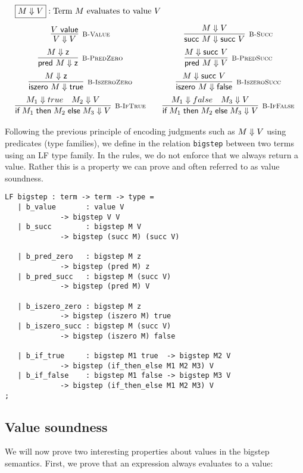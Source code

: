 \[
\begin{array}{c@{\qquad}c}
\multicolumn{2}{l}{\fbox{$M \BSteps V$}: \mbox{Term $M$ evaluates to value $V$}}\\[1em]
  \infer[\BValue]{V \BSteps V}{V \Value} &
  \infer[\BSucc]{\tmsucc M \BSteps \tmsucc V}{M \BSteps V}
\\[0.5em]
  \infer[\BPredZero]{\tmpred M \BSteps \tmzero}{M \BSteps \tmzero} &
  \infer[\BPredSucc]{\tmpred M \BSteps V}{M \BSteps \tmsucc V}
\\[0.5em]
  \infer[\BIszeroZero]{\tmiszero M \BSteps \tmtrue} {M \BSteps \tmzero} &
  \infer[\BIszeroSucc]{\tmiszero M \BSteps \tmfalse}{M \BSteps \tmsucc V}
\\[0.5em]
  \infer[\BIfTrue] {\tmif {M_1}{M_2}{M_3} \BSteps V}{M_1 \BSteps true  & M_2 \BSteps V} &
  \infer[\BIfFalse]{\tmif {M_1}{M_2}{M_3} \BSteps V}{M_1 \BSteps false & M_3 \BSteps V} \\
\end{array}
\]

Following the previous principle of encoding judgments such as $M \Downarrow V$
using predicates (type families), we define in \beluga the relation
\lstinline!bigstep! between two terms using an LF type family. In the rules, we
do not enforce that we always return a value. Rather this is a property we can
prove and often referred to as value soundness.

\begin{lstlisting}
LF bigstep : term -> term -> type =
   | b_value       : value V
		     -> bigstep V V
   | b_succ        : bigstep M V
		     -> bigstep (succ M) (succ V)

   | b_pred_zero   : bigstep M z
		     -> bigstep (pred M) z
   | b_pred_succ   : bigstep M (succ V)
		     -> bigstep (pred M) V

   | b_iszero_zero : bigstep M z
		     -> bigstep (iszero M) true
   | b_iszero_succ : bigstep M (succ V)
		     -> bigstep (iszero M) false

   | b_if_true     : bigstep M1 true  -> bigstep M2 V
		     -> bigstep (if_then_else M1 M2 M3) V
   | b_if_false    : bigstep M1 false -> bigstep M3 V
		     -> bigstep (if_then_else M1 M2 M3) V
;
\end{lstlisting}

\subsection{Value soundness}

We will now prove two interesting properties about values in the bigstep semantics.
First, we prove that an expression always evaluates to a value:

